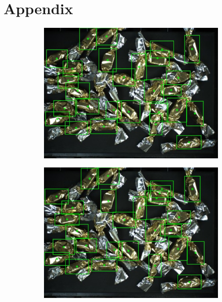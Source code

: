 \chapter*{Appendix}\label{appendix}
\begin{figure}[H]

  \begin{subfigure}{0.5\textwidth}
    \centering
    \includegraphics[width=\linewidth]{Sources/Figures/appendix/actual_62.jpg}

  \end{subfigure}
  \begin{subfigure}{0.5\textwidth}
    \centering
    \includegraphics[width=\linewidth]{Sources/Figures/appendix/pred_62.jpg}


\end{subfigure}
\end{figure}
